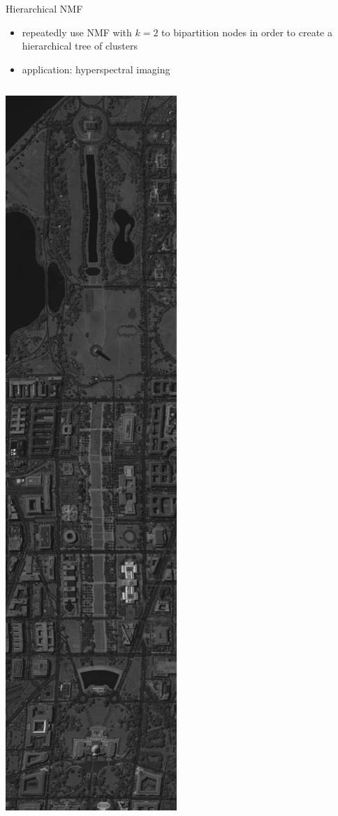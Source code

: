 \documentclass{beamer}
\begin{document}
\begin{frame}{Hierarchical NMF}

\begin{itemize}
	\item repeatedly use NMF with $k = 2$ to bipartition nodes in order to create a hierarchical tree of clusters
	\item application: hyperspectral imaging
\end{itemize}

\begin{columns}
\begin{column}{.4\textwidth}
    \centering
    \includegraphics[height=0.6\textheight]{../data/DC/0.png}

\end{column}
\end{columns}
\end{frame}
\end{document}
